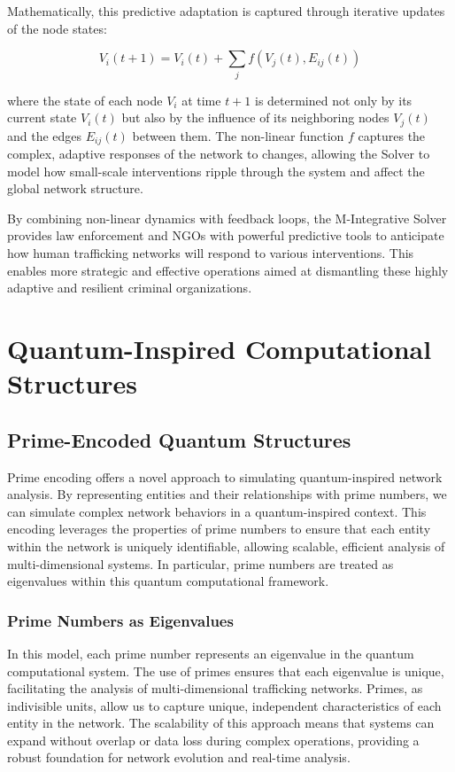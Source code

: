 \documentclass[%
 preprint, linenumbers,
 amsmath,amssymb,
 aps, physrev,
]{revtex4-2}
\begin{document}
Mathematically, this predictive adaptation is captured through iterative updates of the node states:

\[
V_i(t+1) = V_i(t) + \sum_{j} f(V_j(t), E_{ij}(t))
\]

where the state of each node \( V_i \) at time \( t+1 \) is determined not only by its current state \( V_i(t) \) but also by the influence of its neighboring nodes \( V_j(t) \) and the edges \( E_{ij}(t) \) between them. The non-linear function \( f \) captures the complex, adaptive responses of the network to changes, allowing the Solver to model how small-scale interventions ripple through the system and affect the global network structure.

By combining non-linear dynamics with feedback loops, the M-Integrative Solver provides law enforcement and NGOs with powerful predictive tools to anticipate how human trafficking networks will respond to various interventions. This enables more strategic and effective operations aimed at dismantling these highly adaptive and resilient criminal organizations.
\section{Quantum-Inspired Computational Structures}

\subsection{Prime-Encoded Quantum Structures}

Prime encoding offers a novel approach to simulating quantum-inspired network analysis. By representing entities and their relationships with prime numbers, we can simulate complex network behaviors in a quantum-inspired context. This encoding leverages the properties of prime numbers to ensure that each entity within the network is uniquely identifiable, allowing scalable, efficient analysis of multi-dimensional systems. In particular, prime numbers are treated as eigenvalues within this quantum computational framework.

\subsubsection{Prime Numbers as Eigenvalues}

In this model, each prime number represents an eigenvalue in the quantum computational system. The use of primes ensures that each eigenvalue is unique, facilitating the analysis of multi-dimensional trafficking networks. Primes, as indivisible units, allow us to capture unique, independent characteristics of each entity in the network. The scalability of this approach means that systems can expand without overlap or data loss during complex operations, providing a robust foundation for network evolution and real-time analysis.
\end{document}

